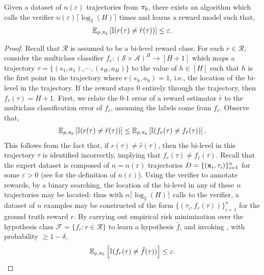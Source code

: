 \begin{theorem} \label{thm:reward-estimation}
Given a dataset of $n(\varepsilon)$ trajectories from $\pi_b$, there exists an algorithm which calls the verifier $n(\varepsilon) \lceil \log_2 (H) \rceil$ times and learns a reward model such that,
\begin{align}
    \mathbb{E}_{\rho, \pi_b} \left[ \mathbb{I} ( r(\tau) \ne \hat{r} (\tau)) \right] \le \varepsilon.
\end{align}
\end{theorem}
\begin{proof}
Recall that $\mathcal{R}$ is assumed to be a bi-level reward class.
For each $r \in \mathcal{R}$, consider the multiclass classifier $f_r : (\mathcal{S} \times \mathcal{A})^H \to [H+1]$ which maps a trajectory $\tau = \{ (s_1,a_1),\cdots,(s_H,a_H) \}$ to the value of $h \in [H]$ such that $h$ is the first point in the trajectory where $r(s_h,a_h) = 1$, i.e., the location of the bi-level in the trajectory. If the reward stays $0$ entirely through the trajectory, then $f_r (\tau) = H+1$. First, we relate the $0$-$1$ error of a reward estimator $\hat{r}$ to the multiclass classification error of $f_r$, assuming the labels come from $f_r$. Observe that,
\begin{align}
    \mathbb{E}_{\rho,\pi_b} \left[ \mathbb{I} (r(\tau) \ne \hat{r} (\tau)) \right] \le \mathbb{E}_{\rho,\pi_b} \left[ \mathbb{I} (f_r (\tau) \ne f_{\hat{r}} (\tau)) \right].
\end{align}
This follows from the fact that, if $r(\tau) \ne \hat{r} (\tau)$, then the bi-level in this trajectory $\tau$ is identified incorrectly, implying that $f_r (\tau) \ne f_{\hat{r}} (\tau)$. Recall that the expert dataset is composed of $n=n(\varepsilon)$ trajectories $D = \{ (\mathbf{x}_i,\tau_i) \}_{i=1}^n$ for some $\varepsilon > 0$ (see  for the definition of $n(\varepsilon)$). Using the verifier to annotate rewards, by a binary searching, the location of the bi-level in any of these $n$ trajectories may be located: thus with $n \lceil \log_2 (H) \rceil$ calls to the verifier, a dataset of $n$ examples may be constructed of the form $\{ (\tau_i,f_r (\tau)) \}_{i=1}^n$ for the ground truth reward $r$. By carrying out empirical risk minimization over the hypothesis class $\mathcal{F} = \{ f_r : r \in \mathcal{R} \}$ to learn a hypothesis $\hat{f}$, and invoking , with probability $\ge 1-\delta$,
\begin{align}
    \mathbb{E}_{\rho, \pi_b} \left[ \mathbb{I} (f_r (\tau) \ne \hat{f} (\tau)) \right] \le \varepsilon.
\end{align}
\end{proof}

